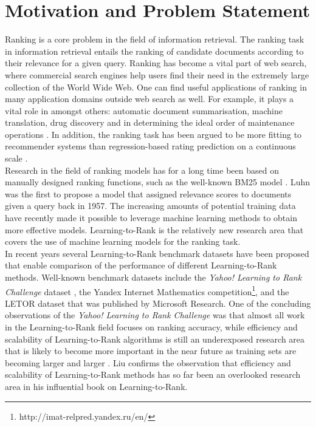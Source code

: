 \section{Motivation and Problem Statement}
\label{sec:motivation}
Ranking is a core problem in the field of information retrieval. The ranking task in information retrieval entails the ranking of candidate documents according to their relevance for a given query. Ranking has become a vital part of web search, where commercial search engines help users find their need in the extremely large collection of the World Wide Web. One can find useful applications of ranking in many application domains outside web search as well. For example, it plays a vital role in amongst others: automatic document summarisation, machine translation, drug discovery and in determining the ideal order of maintenance operations \cite{Rudin2009}. In addition, the ranking task has been argued to be more fitting to recommender systems than regression-based rating prediction on a continuous scale \cite{Adomavicius2005,McNee2006}.\\

Research in the field of ranking models has for a long time been based on manually designed ranking functions, such as the well-known BM25 model \cite{Robertson1994}. Luhn \cite{Luhn1957} was the first to propose a model that assigned relevance scores to documents given a query back in 1957. The increasing amounts of potential training data have recently made it possible to leverage machine learning methods to obtain more effective models. Learning-to-Rank is the relatively new research area that covers the use of machine learning models for the ranking task.\\

In recent years several Learning-to-Rank benchmark datasets have been proposed that enable comparison of the performance of different Learning-to-Rank methods. Well-known benchmark datasets include the \emph{Yahoo! Learning to Rank Challenge} dataset \cite{Chapelle2011a}, the Yandex Internet Mathematics competition\footnote{http://imat-relpred.yandex.ru/en/}, and the LETOR dataset \cite{Qin2010} that was published by Microsoft Research. One of the concluding observations of the \emph{Yahoo! Learning to Rank Challenge} was that almost all work in the Learning-to-Rank field focuses on ranking accuracy, while efficiency and scalability of Learning-to-Rank algorithms is still an underexposed research area that is likely to become more important in the near future as training sets are becoming larger and larger \cite{Chapelle2011b}. Liu \cite{Liu2007} confirms the observation that efficiency and scalability of Learning-to-Rank methods has so far been an overlooked research area in his influential book on Learning-to-Rank.\\

